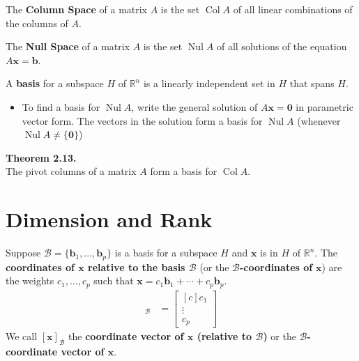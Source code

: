 \documentclass[10pt]{book}
\newenvironment{boxthm}{\begin{mdframed}[backgroundcolor=gray!30,nobreak=true]}{\end{mdframed}}
\newenvironment{boxdef}{\begin{mdframed}[backgroundcolor=gray!30,linewidth=0pt,nobreak=true]}{\end{mdframed}}
\newcommand{\B}{\mathscr{B}}
\newcommand{\vect}[1]{\ensuremath{\boldsymbol{\mathbf{#1}}}}
\DeclareMathOperator{\Nul}{Nul}
\DeclareMathOperator{\Col}{Col}
\newcommand{\Axz}{A\vect{x}=\vect{0}}
\newcommand{\vectset}[3][v]{\{\vect{#1}_{#2},\ldots,\vect{#1}_{#3}\}}
\newcommand{\vectB}[1][x]{[\vect{#1}]_\B}
\begin{document}
\begin{boxdef}
The {\bf Column Space} of a matrix $A$ is the set $\Col A$ of all linear combinations of the columns of $A$.
\end{boxdef}

\begin{boxdef}
The {\bf Null Space} of a matrix $A$ is the set $\Nul A$ of all solutions of the equation $A\vect{x}=\vect{b}$.
\end{boxdef}


\begin{boxdef}
A {\bf basis} for a subspace $H$ of $\mathbb{R}^n$ is a linearly independent set in $H$ that spans $H$.
\end{boxdef}

\begin{itemize}
\item To find a basis for $\Nul A$, write the general solution of $\Axz$ in parametric vector form. The vectors in the solution form a basis for $\Nul A$ (whenever $\Nul A \neq \{\vect{0}\}$)

\end{itemize}

\begin{boxthm}
	\textbf{Theorem 2.13.} \\
	The pivot columns of a matrix $A$ form a basis for $\Col A$.
\end{boxthm}

\section{Dimension and Rank}
\begin{boxdef}
	Suppose $\B=\vectset[b]{1}{p}$ is a basis for a subspace $H$ and $\vect{x}$ is in $H$ of $\mathbb{R}^n$. The \textbf{coordinates of $\boldsymbol{\vect{x}}$ relative to the basis $\boldsymbol{\B}$} (or the $\boldsymbol{\B}$\textbf{-coordinates of} $\boldsymbol{\vect{x}}$) are the weights $c_1,\ldots,c_p$ such that $\vect{x} = c_1\vect{b}_1 + \cdots + c_p\vect{b}_p$.
	\begin{align*}
	\vectB &= \begin{bmatrix}[c]c_1 \\ \vdots \\ c_p\end{bmatrix}
	\end{align*}
	We call $\vectB$ the \textbf{coordinate vector of $\boldsymbol{\vect{x}}$ (relative to $\boldsymbol{\B}$)} or the \textbf{$\boldsymbol{\B}$-coordinate vector of $\boldsymbol{\vect{x}}$}.
\end{boxdef}
\end{document}
